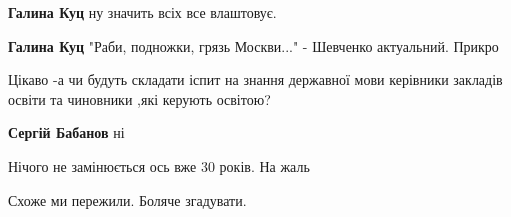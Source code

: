 \begin{itemize}
\begin{itemize}
 
\textbf{Галина Куц} ну значить всіх все влаштовує.

 
\textbf{Галина Куц} "Раби, подножки, грязь Москви..." - Шевченко актуальний. Прикро
\end{itemize}

 
Цікаво -а чи будуть складати іспит на знання державної мови керівники закладів
освіти та чиновники ,які керують освітою?

\begin{itemize}
 
\textbf{Сергій Бабанов} ні
\end{itemize}

 
Нічого не замінюється ось вже 30 років. На жаль

\begin{itemize}
 
Схоже ми пережили. Боляче згадувати.


\end{itemize}
\end{itemize}
